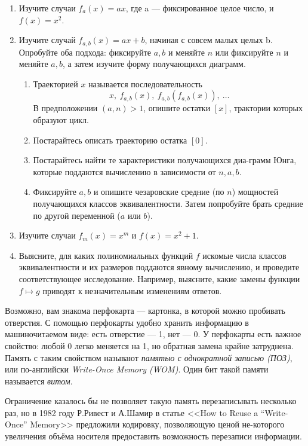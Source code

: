 \begin{enumerate}
\item Изучите случаи $f_a(x)=ax$, где a --- фиксированное целое число, и $f(x)=x^2$.
\item Изучите случай $f_{a, b}(x) = ax+b$, начиная с совсем малых целых b. Опробуйте оба подхода: фиксируйте $a,b$ и меняйте $n$ или фиксируйте $n$ и меняйте $a,b$, а затем изучите форму получающихся диаграмм.
\begin{enumerate}
\item Траекторией $x$ называется последовательность
	$$x,\ f_{a,b}(x),\ f_{a,b}(f_{a,b}(x)),\ \ldots$$
В предположении $(a,n) > 1$, опишите остатки $[x]$, трактории которых образуют цикл.
\item Постарайтесь описать траекторию остатка $[0]$.
\item Постарайтесь найти те характеристики получающихся диа-\linebreak грамм Юнга, которые поддаются вычислению в зависимости от $n,a,b$.
\item Фиксируйте $a,b$ и опишите чезаровские средние (по $n$) мощностей получающихся классов эквивалентности. Затем попробуйте брать средние по другой переменной ($a$ или $b$).
\end{enumerate}
\item Изучите случаи $f_m(x) = x^m$ и $f(x) = x^2+1$.
\item Выясните, для каких полиномиальных функций $f$ искомые числа классов эквивалентности и их размеров поддаются явному вычислению, и проведите соответствующее исследование. Например, выясните, какие замены функции $f \mapsto g$ приводят к незначительным изменениям ответов.
\end{enumerate}

\bigskip


\medskip

Возможно, вам знакома перфокарта --- картонка, в которой можно пробивать отверстия. С помощью перфокарты удобно хранить информацию в машиночитаемом виде: есть отверстие --- 1, нет --- 0. У перфокарты есть важное свойство: любой 0 легко меняется на 1, но обратная замена крайне затруднена. Память с таким свойством называют \emph{памятью с однократной записью (ПОЗ)}, или по-английски \emph{Write-Once Memory (WOM)}. Один бит такой памяти называется \emph{витом}.

Ограничение казалось бы не позволяет такую память перезаписывать несколько
раз, но в 1982 году Р.Ривест и А.Шамир в статье <<How to Reuse a ``Write-Once'' Memory>> предложили кодировку, позволяющую ценой не-\linebreak которого увеличения объёма носителя предоставить возможность перезаписи информации.
                                                     
